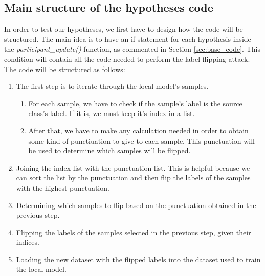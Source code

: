 
\subsection{Main structure of the hypotheses code}
In order to test our hypotheses, we first have to design how the code will be structured. The main idea is to have an if-statement for each hypothesis inside the \textit{participant\_update()} function, as commented in Section \ref{sec:base_code}. This condition will contain all the code needed to perform the label flipping attack. The code will be structured as follows:
\begin{enumerate}
        \item The first step is to iterate through the local model's samples.
                \begin{enumerate}
                        \item For each sample, we have to check if the sample's label is the source class's label. If it is, we must keep it's index in a list.
                        \item After that, we have to make any calculation needed in order to obtain some kind of punctiuation to give to each sample. This punctuation will be used to determine which samples will be flipped.
                \end{enumerate}
        \item Joining the index list with the punctuation list. This is helpful because we can sort the list by the punctuation and then flip the labels of the samples with the highest punctuation.
        \item Determining which samples to flip based on the punctuation obtained in the previous step.
        \item Flipping the labels of the samples selected in the previous step, given their indices.
        \item Loading the new dataset with the flipped labels into the dataset used to train the local model.
\end{enumerate}

